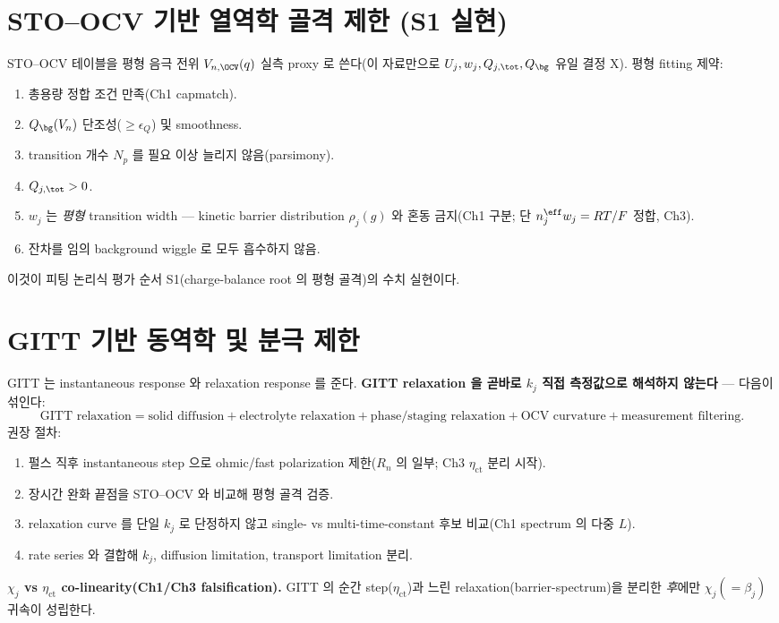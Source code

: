 \section{STO--OCV 기반 열역학 골격 제한 (S1 실현)}\label{sec:ch6_ocv}
STO--OCV 테이블을 평형 음극 전위 $V_{n,\OCV}(q)$ 실측 proxy 로 쓴다(이 자료만으로 $U_j,w_j,Q_{j,\tot},Q_\bg$
유일 결정 X). 평형 fitting 제약:
\begin{enumerate}[label=O\arabic*),leftmargin=2.2em]
\item 총용량 정합 조건 만족(Ch1 capmatch).
\item $Q_\bg(V_n)$ 단조성($\ge\epsilon_Q$) 및 smoothness.
\item transition 개수 $N_p$ 를 필요 이상 늘리지 않음(parsimony).
\item $Q_{j,\tot}>0$.
\item $w_j$ 는 \emph{평형} transition width — kinetic barrier distribution $\rho_j(g)$ 와 혼동 금지(Ch1
  구분; 단 $n_j^{\eff}w_j=RT/F$ 정합, Ch3).
\item 잔차를 임의 background wiggle 로 모두 흡수하지 않음.
\end{enumerate}
이것이 피팅 논리식 평가 순서 S1(charge-balance root 의 평형 골격)의 수치 실현이다.

\section{GITT 기반 동역학 및 분극 제한}\label{sec:ch6_gitt}
GITT 는 instantaneous response 와 relaxation response 를 준다. \textbf{GITT relaxation 을 곧바로 $k_j$ 직접
측정값으로 해석하지 않는다} — 다음이 섞인다:
\begin{equation}
\text{GITT relaxation}=\text{solid diffusion}+\text{electrolyte relaxation}+\text{phase/staging relaxation}+\text{OCV curvature}+\text{measurement filtering}.
\label{eq:ch6_gitt_decomp}
\end{equation}
권장 절차:
\begin{enumerate}[label=G\arabic*),leftmargin=2.2em]
\item 펄스 직후 instantaneous step 으로 ohmic/fast polarization 제한($R_n$ 의 일부; Ch3 $\eta_{\mathrm{ct}}$ 분리 시작).
\item 장시간 완화 끝점을 STO--OCV 와 비교해 평형 골격 검증.
\item relaxation curve 를 단일 $k_j$ 로 단정하지 않고 single- vs multi-time-constant 후보 비교(Ch1 spectrum 의 다중 $L$).
\item rate series 와 결합해 $k_j$, diffusion limitation, transport limitation 분리.
\end{enumerate}
\textbf{$\chi_j$ vs $\eta_{\mathrm{ct}}$ co-linearity(Ch1/Ch3 falsification).} GITT 의 순간 step($\eta_{\mathrm{ct}}$)과
느린 relaxation(barrier-spectrum)을 분리한 \emph{후}에만 $\chi_j(=\beta_j)$ 귀속이 성립한다.

